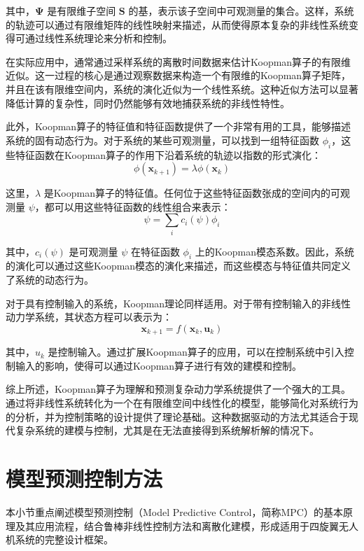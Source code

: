\documentclass[lang=chs, degree=master, blindreview=false, winfonts=true]{yanputhesis}
\begin{document}
其中，\( \bm \Psi \) 是有限维子空间 \( \mathcal{\bm S} \) 的基，表示该子空间中可观测量的集合。这样，系统的轨迹可以通过有限维矩阵的线性映射来描述，从而使得原本复杂的非线性系统变得可通过线性系统理论来分析和控制。

在实际应用中，通常通过采样系统的离散时间数据来估计Koopman算子的有限维近似。这一过程的核心是通过观察数据来构造一个有限维的Koopman算子矩阵，并且在该有限维空间内，系统的演化近似为一个线性系统。这种近似方法可以显著降低计算的复杂性，同时仍然能够有效地捕获系统的非线性特性。

此外，Koopman算子的特征值和特征函数提供了一个非常有用的工具，能够描述系统的固有动态行为。对于系统的某些可观测量，可以找到一组特征函数 \( \phi_i \)，这些特征函数在Koopman算子的作用下沿着系统的轨迹以指数的形式演化：
\begin{equation}
    \phi(\bm x_{k+1}) = \lambda \phi(\bm  x_k)
\end{equation}

这里，\( \lambda \) 是Koopman算子的特征值。任何位于这些特征函数张成的空间内的可观测量 \( \psi \)，都可以用这些特征函数的线性组合来表示：
\begin{equation}
    \psi = \sum_i c_i(\psi) \phi_i
\end{equation}

其中，\( c_i(\psi) \) 是可观测量 \( \psi \) 在特征函数 \( \phi_i \) 上的Koopman模态系数。因此，系统的演化可以通过这些Koopman模态的演化来描述，而这些模态与特征值共同定义了系统的动态行为。

对于具有控制输入的系统，Koopman理论同样适用。对于带有控制输入的非线性动力学系统，其状态方程可以表示为：
\begin{equation}
    \bm x_{k+1} = f(\bm x_k, \bm u_k)
\end{equation}

其中，\( u_k \) 是控制输入。通过扩展Koopman算子的应用，可以在控制系统中引入控制输入的影响，使得可以通过Koopman算子进行有效的建模和控制。

综上所述，Koopman算子为理解和预测复杂动力学系统提供了一个强大的工具。通过将非线性系统转化为一个在有限维空间中线性化的模型，能够简化对系统行为的分析，并为控制策略的设计提供了理论基础。这种数据驱动的方法尤其适合于现代复杂系统的建模与控制，尤其是在无法直接得到系统解析解的情况下。


\section{模型预测控制方法}
本小节重点阐述模型预测控制（Model Predictive Control，简称MPC）的基本原理及其应用流程，结合鲁棒非线性控制方法和离散化建模，形成适用于四旋翼无人机系统的完整设计框架。
\end{document}
